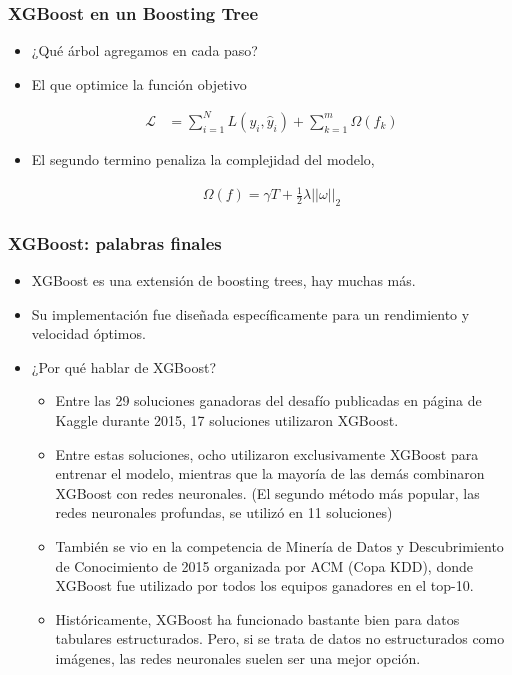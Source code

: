 \documentclass[
  shownotes,
  xcolor={svgnames},
  hyperref={colorlinks,citecolor=DarkBlue,linkcolor=DarkRed,urlcolor=DarkBlue}
  , aspectratio=169]{beamer}
\begin{document}
\begin{frame}[fragile]
\frametitle{XGBoost en un Boosting Tree }

\begin{itemize}


\item ¿Qué árbol agregamos en cada paso?
\item El que optimice la función objetivo


\begin{align}
\mathcal{L} &= \sum_{i=1}^N L(y_i,\hat{y}_i) + \sum_{k=1}^m \Omega(f_k)
\end{align}


\item  El segundo termino penaliza la complejidad del modelo,


\begin{align}
\Omega(f)=\gamma T + \frac{1}{2}\lambda ||\omega||_2
\end{align}
\end{itemize}
\end{frame}
\begin{frame}[fragile]
\frametitle{XGBoost: palabras finales}

\begin{itemize}

\item XGBoost es una extensión de boosting trees, hay muchas más.
\medskip
\item Su implementación fue diseñada específicamente para un rendimiento y velocidad óptimos.
\medskip
\item ¿Por qué hablar de XGBoost?
\begin{itemize}
\footnotesize
 \item Entre las 29 soluciones ganadoras del desafío publicadas en página de Kaggle durante 2015, 17 soluciones utilizaron XGBoost.
 \item Entre estas soluciones, ocho utilizaron exclusivamente XGBoost para entrenar el modelo, mientras que la mayoría de las demás combinaron XGBoost con redes neuronales. (El segundo método más popular, las redes neuronales profundas, se utilizó en 11 soluciones)
 \item También se vio en la competencia de Minería de Datos y Descubrimiento de Conocimiento de 2015 organizada por ACM (Copa KDD), donde XGBoost fue utilizado por todos los equipos ganadores en el top-10.
 \item Históricamente, XGBoost ha funcionado bastante bien para datos tabulares estructurados. Pero, si se trata de datos no estructurados como imágenes, las redes neuronales suelen ser una mejor opción.


\end{itemize}
 \end{itemize}
\end{frame}
\end{document}
